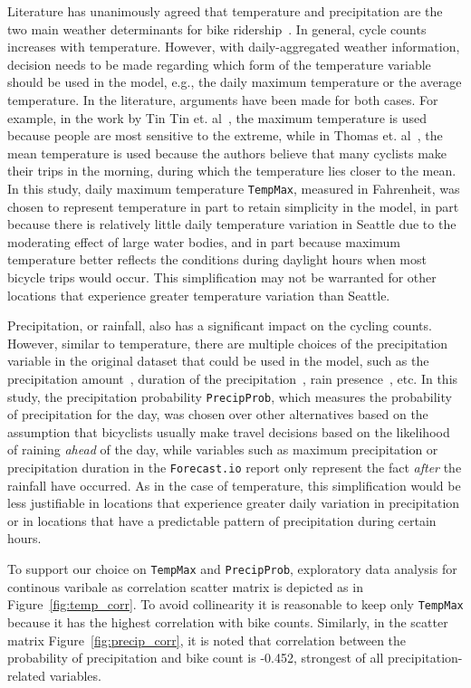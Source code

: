 \documentclass [11pt, proquest] {uwthesis}[2015/03/03]
\begin{document}
Literature has unanimously agreed that temperature and precipitation are the two main weather determinants for bike ridership~\cite{Nosal:2014aa,Tin:2012aa}. In general, cycle counts increases with temperature. However, with daily-aggregated weather information, decision needs to be made regarding which form of the temperature variable should be used in the model, e.g., the daily maximum temperature or the average temperature. In the literature, arguments have been made for both cases. For example, in the work by Tin Tin et. al~\cite{Tin:2012aa}, the maximum temperature is used because people are most sensitive to the extreme, while in Thomas et. al~\cite{Thomas:2009aa}, the mean temperature is used because the authors believe that many cyclists make their trips in the morning, during which the temperature lies closer to the mean. In this study, daily maximum temperature \texttt{TempMax}, measured in Fahrenheit, was chosen to represent temperature in part to retain simplicity in the model, in part because there is relatively little daily temperature variation in Seattle due to the moderating effect of large water bodies, and in part because maximum temperature better reflects the conditions during daylight hours when most bicycle trips would occur. This simplification may not be warranted for other locations that experience greater temperature variation than Seattle. 

Precipitation, or rainfall, also has a significant impact on the cycling counts. However, similar to temperature, there are multiple choices of the precipitation variable in the original dataset that could be used in the model, such as the precipitation amount~\cite{Ahmed12}, duration of the precipitation~\cite{Thomas:2009aa}, rain presence~\cite{Miranda-Moreno:2011aa}, etc. In this study, the precipitation probability \texttt{PrecipProb}, which measures the probability of precipitation for the day, was chosen over other alternatives based on the assumption that bicyclists usually make travel decisions based on the likelihood of raining \emph{ahead} of the day, while variables such as maximum precipitation or precipitation duration in the \texttt{Forecast.io} report only represent the fact \emph{after} the rainfall have occurred. As in the case of temperature, this simplification would be less justifiable in locations that experience greater daily variation in precipitation or in locations that have a predictable pattern of precipitation during certain hours.

To support our choice on \texttt{TempMax} and \texttt{PrecipProb}, exploratory data analysis for continous varibale as correlation scatter matrix is depicted as in Figure~\ref{fig:temp_corr}. To avoid collinearity it is reasonable to keep only \texttt{TempMax} because it has the highest correlation with bike counts. Similarly, in the scatter matrix Figure~\ref{fig:precip_corr}, it is noted that correlation between the probability of precipitation and bike count is -0.452, strongest of all precipitation-related variables. 
\end{document}
